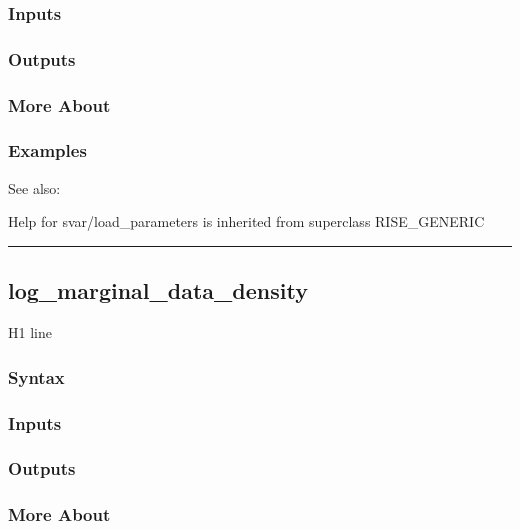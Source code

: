\documentclass[letterpaper,10pt,english]{sphinxmanual}
\begin{document}
\subsubsection{Inputs}
\label{classes/models/@svar/svar:id42}

\subsubsection{Outputs}
\label{classes/models/@svar/svar:id43}

\subsubsection{More About}
\label{classes/models/@svar/svar:id44}

\subsubsection{Examples}
\label{classes/models/@svar/svar:id45}
See also:

Help for svar/load\_parameters is inherited from superclass RISE\_GENERIC


\bigskip\hrule{}\bigskip



\subsection{log\_marginal\_data\_density}
\label{classes/models/@svar/svar:id46}\label{classes/models/@svar/svar:log-marginal-data-density}
H1 line


\subsubsection{Syntax}
\label{classes/models/@svar/svar:id47}

\subsubsection{Inputs}
\label{classes/models/@svar/svar:id48}

\subsubsection{Outputs}
\label{classes/models/@svar/svar:id49}

\subsubsection{More About}
\label{classes/models/@svar/svar:id50}
\end{document}
